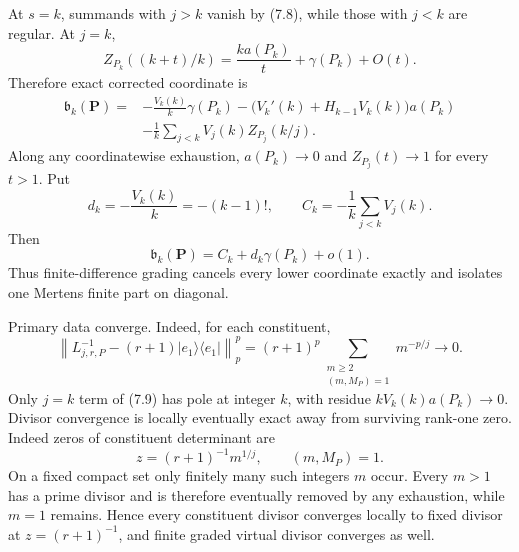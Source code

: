 \documentclass[11pt]{article}
\theoremstyle{definition}
\theoremstyle{remark}
\begin{document}
At $s=k$, summands with $j>k$ vanish by (7.8), while those with $j<k$ are regular.  At $j=k$,
\[
 Z_{P_k}((k+t)/k)=\frac{k a(P_k)}t+\gamma(P_k)+O(t).
\]
Therefore exact corrected coordinate is
\begin{equation}
\begin{split}
 \mathfrak b_k(\mathbf P)
  ={}&-\frac{V_k(k)}k\gamma(P_k)
      -\bigl(V_k'(k)+H_{k-1}V_k(k)\bigr)a(P_k)\\
    &-\frac1k\sum_{j<k}V_j(k)Z_{P_j}(k/j).
\end{split}
\tag{7.10}
\end{equation}
Along any coordinatewise exhaustion, $a(P_k)\to0$ and
$Z_{P_j}(t)\to1$ for every $t>1$.  Put
\begin{equation}
 d_k=-\frac{V_k(k)}k=-(k-1)!,\qquad
 C_k=-\frac1k\sum_{j<k}V_j(k).                          \tag{7.11}
\end{equation}
Then
\begin{equation}
 \mathfrak b_k(\mathbf P)=C_k+d_k\gamma(P_k)+o(1).       \tag{7.12}
\end{equation}
Thus finite-difference grading cancels every lower coordinate exactly and isolates one Mertens
finite part on diagonal.

Primary data converge.  Indeed, for each constituent,
\begin{equation}
 \left\|L_{j,r,P}^{-1}-(r+1)|e_1\rangle\langle e_1|\right\|_p^p
 =(r+1)^p\sum_{\substack{m\geq2\\(m,M_P)=1}}m^{-p/j}\longrightarrow0. \tag{7.13}
\end{equation}
Only $j=k$ term of (7.9) has pole at integer $k$, with residue
$kV_k(k)a(P_k)\to0$.  Divisor convergence is locally eventually exact away from surviving
rank-one zero.  Indeed zeros of constituent determinant are
\[
 z=(r+1)^{-1}m^{1/j},\qquad (m,M_P)=1.
\]
On a fixed compact set only finitely many such integers $m$ occur.  Every $m>1$ has a prime
divisor and is therefore eventually removed by any exhaustion, while $m=1$ remains.  Hence
every constituent divisor converges locally to fixed divisor at $z=(r+1)^{-1}$, and finite
graded virtual divisor converges as well.
\end{document}
